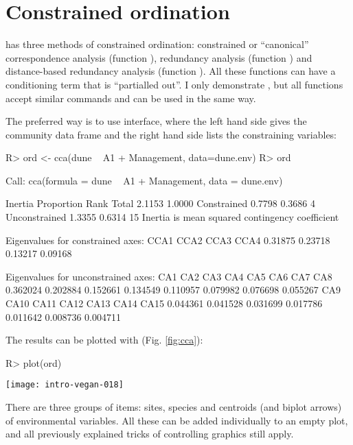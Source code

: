 \documentclass[article,nojss]{jss}
\begin{document}
\section{Constrained ordination}

 has three methods of constrained ordination:
constrained or ``canonical'' correspondence analysis (function
), redundancy analysis (function ) and
distance-based redundancy analysis (function ).  All
these functions can have a conditioning term that is ``partialled
out''.  I only demonstrate , but all functions accept
similar commands and can be used in the same way.

The preferred way is to use  interface, where the left
hand side gives the community data frame and the right hand side lists
the constraining variables:
\begin{Schunk}
\begin{Sinput}
R> ord <- cca(dune ~ A1 + Management, data=dune.env)
R> ord
\end{Sinput}
\begin{Soutput}
Call: cca(formula = dune ~ A1 + Management, data = dune.env)

              Inertia Proportion Rank
Total          2.1153     1.0000     
Constrained    0.7798     0.3686    4
Unconstrained  1.3355     0.6314   15
Inertia is mean squared contingency coefficient 

Eigenvalues for constrained axes:
   CCA1    CCA2    CCA3    CCA4 
0.31875 0.23718 0.13217 0.09168 

Eigenvalues for unconstrained axes:
     CA1      CA2      CA3      CA4      CA5      CA6      CA7      CA8 
0.362024 0.202884 0.152661 0.134549 0.110957 0.079982 0.076698 0.055267 
     CA9     CA10     CA11     CA12     CA13     CA14     CA15 
0.044361 0.041528 0.031699 0.017786 0.011642 0.008736 0.004711 
\end{Soutput}
\end{Schunk}
The results can be plotted with (Fig. \ref{fig:cca}):
\begin{Schunk}
\begin{Sinput}
R> plot(ord)
\end{Sinput}
\end{Schunk}
\begin{SCfigure}
\texttt{[image: intro-vegan-018]}
\caption{Default plot from constrained correspondence analysis.}
\label{fig:cca}
\end{SCfigure}
There are three groups of items: sites, species and centroids (and
biplot arrows) of environmental variables.  All these can be added
individually to an empty plot, and all previously explained tricks of
controlling graphics still apply.
\end{document}
